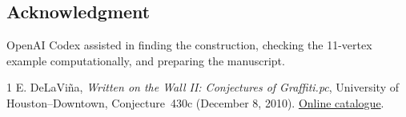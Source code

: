 \documentclass[10pt,letterpaper]{amsart}
\begin{document}
\subsection*{Acknowledgment} OpenAI Codex assisted in finding the construction,
checking the 11-vertex example computationally, and preparing the manuscript.
\begin{thebibliography}{1}
 E. DeLaVi\~na, \emph{Written on the Wall II: Conjectures of Graffiti.pc},
University of Houston--Downtown, Conjecture~430c (December 8, 2010).
\href{https://www.uhd.edu/academics/sciences/mathematics-statistics/wowii/index.html}{Online catalogue}.
\end{thebibliography}
\end{document}
